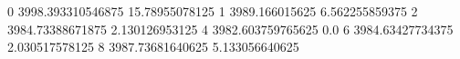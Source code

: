 0 3998.393310546875 15.78955078125
1 3989.166015625 6.562255859375
2 3984.73388671875 2.130126953125
4 3982.603759765625 0.0
6 3984.63427734375 2.030517578125
8 3987.73681640625 5.133056640625
